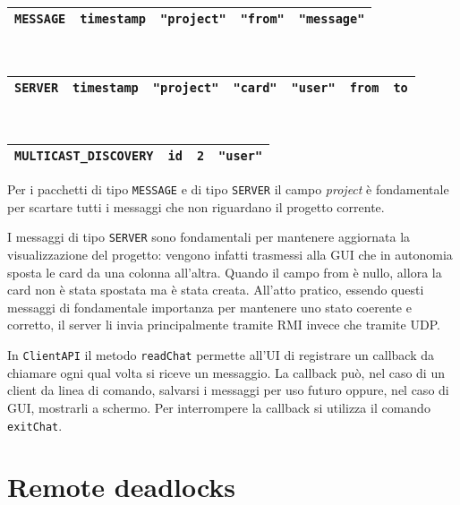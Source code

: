 \documentclass[a4paper,11pt] {article}
\begin{document}
\begin{table}[H]
	\begin{tabular}{|l|l|l|l|l|}
		\hline
		\texttt{MESSAGE} & \texttt{timestamp} & \texttt{"project"} & \texttt{"from"} & \texttt{"message"} \\ \hline
	\end{tabular}
	~\\
	\begin{tabular}{|l|l|l|l|l|l|l|}
		\hline
		\texttt{SERVER} & \texttt{timestamp} & \texttt{"project"} & \texttt{"card"} & \texttt{"user"} & \texttt{from} & \texttt{to} \\ \hline
	\end{tabular}
	~\\
	\begin{tabular}{|l|l|l|l|}
		\hline
		\texttt{MULTICAST_DISCOVERY} & \texttt{id} & \texttt{2} & \texttt{"user"} \\ \hline
	\end{tabular}
\end{table}

Per i pacchetti di tipo \texttt{MESSAGE} e di tipo \texttt{SERVER} il campo \textit{project} è fondamentale per scartare tutti i messaggi che non riguardano il progetto corrente.

I messaggi di tipo \texttt{SERVER} sono fondamentali per mantenere aggiornata la visualizzazione del progetto: vengono infatti trasmessi alla GUI che in autonomia sposta le card da una colonna all'altra. Quando il campo from è nullo, allora la card non è stata spostata ma è stata creata. All'atto pratico, essendo questi messaggi di fondamentale importanza per mantenere uno stato coerente e corretto, il server li invia principalmente tramite RMI invece che tramite UDP.

In \texttt{ClientAPI} il metodo \texttt{readChat} permette all'UI di registrare un callback da chiamare ogni qual volta si riceve un messaggio. La callback può, nel caso di un client da linea di comando, salvarsi i messaggi per uso futuro oppure, nel caso di GUI, mostrarli a schermo. Per interrompere la callback si utilizza il comando \texttt{exitChat}.

\section*{Remote deadlocks}
\end{document}
